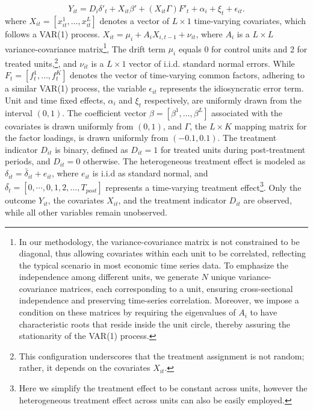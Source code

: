 \documentclass[12pt]{article}
\begin{document}
\begin{equation}
Y_{it} = D_{i} \delta'_{t} + X_{it}\beta' + (X_{it}\Gamma) F'_{t} + \alpha_i + \xi_t + \epsilon_{it}.
\label{eq: dgp}
\end{equation}
where $X_{it} = [x_{it}^1, \ldots, x_{it}^{L}]$ denotes a vector of $L \times 1$ time-varying covariates, which follows a VAR(1) process. $X_{it} = \mu_i + A_i X_{i,t-1} + \nu_{it}$, where $A_i$ is a $ L \times L$ variance-covariance matrix\footnote{In our methodology, the variance-covariance matrix is not constrained to be diagonal, thus allowing covariates within each unit to be correlated, reflecting the typical scenario in most economic time series data. To emphasize the independence among different units, we generate $N$ unique variance-covariance matrices, each corresponding to a unit, ensuring cross-sectional independence and preserving time-series correlation. Moreover, we impose a condition on these matrices by requiring the eigenvalues of $A_i$ to have characteristic roots that reside inside the unit circle, thereby assuring the stationarity of the VAR(1) process.}, The drift term $\mu_i$ equals 0 for control units and 2 for treated units,\footnote{This configuration underscores that the treatment assignment is not random; rather, it depends on the covariates $X_{it}$.}, and $\nu_{it}$ is a $L \times 1$ vector of i.i.d. standard normal errors. While $F_t = [f_t^1, \ldots, f_t^K]$ denotes the vector of time-varying common factors, adhering to a similar VAR(1) process, the variable $\epsilon_{it}$ represents the idiosyncratic error term. Unit and time fixed effects, $\alpha_i$ and $\xi_{t}$ respectively, are uniformly drawn from the interval $(0,1)$. The coefficient vector $\beta = [\beta^1, \ldots, \beta^{L}]$ associated with the covariates is drawn uniformly from $(0,1)$, and $\Gamma$, the $L \times K$ mapping matrix for the factor loadings, is drawn uniformly from $(-0.1, 0.1)$. The treatment indicator $D_{it}$ is binary, defined as $D_{it} = 1$ for treated units during post-treatment periods, and $D_{it} = 0$ otherwise. The heterogeneous treatment effect is modeled as $\delta_{it} = \bar{\delta}_{it} + e_{it}$, where $e_{it}$ is i.i.d as standard normal, and $\bar{\delta_t} = [0, \cdots, 0, 1,2,\ldots,T_{post}]$ represents a time-varying treatment effect\footnote{Here we simplify the treatment effect to be constant across units, however the heterogeneous treatment effect across units can also be easily employed.}. Only the outcome $Y_{it}$, the covariates $X_{it}$, and the treatment indicator $D_{it}$ are observed, while all other variables remain unobserved.
\end{document}

